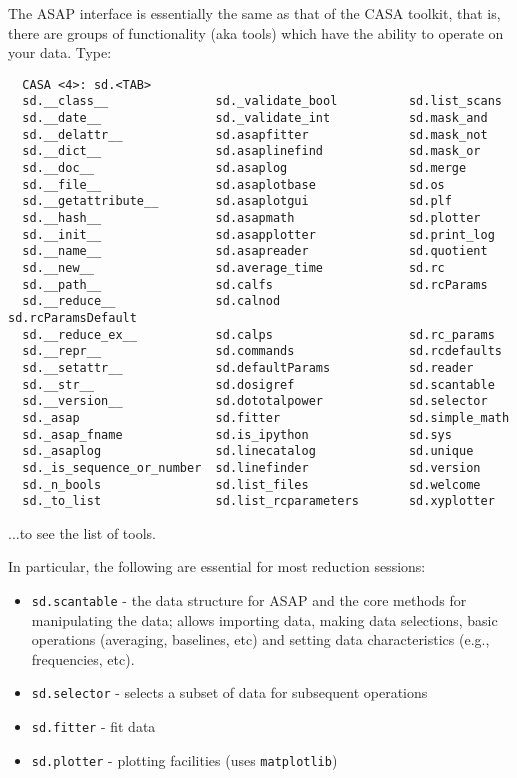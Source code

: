 The ASAP interface is essentially the same as that
of the CASA toolkit, that is, there are groups of functionality (aka
tools) which have the ability to operate on your data. Type:

\small
\begin{verbatim}
  CASA <4>: sd.<TAB>
  sd.__class__               sd._validate_bool          sd.list_scans
  sd.__date__                sd._validate_int           sd.mask_and
  sd.__delattr__             sd.asapfitter              sd.mask_not
  sd.__dict__                sd.asaplinefind            sd.mask_or
  sd.__doc__                 sd.asaplog                 sd.merge
  sd.__file__                sd.asaplotbase             sd.os
  sd.__getattribute__        sd.asaplotgui              sd.plf
  sd.__hash__                sd.asapmath                sd.plotter
  sd.__init__                sd.asapplotter             sd.print_log
  sd.__name__                sd.asapreader              sd.quotient
  sd.__new__                 sd.average_time            sd.rc
  sd.__path__                sd.calfs                   sd.rcParams
  sd.__reduce__              sd.calnod                  sd.rcParamsDefault
  sd.__reduce_ex__           sd.calps                   sd.rc_params
  sd.__repr__                sd.commands                sd.rcdefaults
  sd.__setattr__             sd.defaultParams           sd.reader
  sd.__str__                 sd.dosigref                sd.scantable
  sd.__version__             sd.dototalpower            sd.selector
  sd._asap                   sd.fitter                  sd.simple_math
  sd._asap_fname             sd.is_ipython              sd.sys
  sd._asaplog                sd.linecatalog             sd.unique
  sd._is_sequence_or_number  sd.linefinder              sd.version
  sd._n_bools                sd.list_files              sd.welcome
  sd._to_list                sd.list_rcparameters       sd.xyplotter
\end{verbatim}
\normalsize

...to see the list of tools.

In particular, the following are essential for most reduction
sessions: 
\begin{itemize}
   \item {\tt sd.scantable} - the data structure for ASAP and the core
         methods for manipulating the data; allows importing data,
         making data selections, basic operations (averaging,
         baselines, etc) and setting data characteristics (e.g.,
         frequencies, etc).
   \item {\tt sd.selector} - selects a subset of data for subsequent operations
   \item {\tt sd.fitter} - fit data 
   \item {\tt sd.plotter} - plotting facilities (uses {\tt matplotlib})
\end{itemize}

